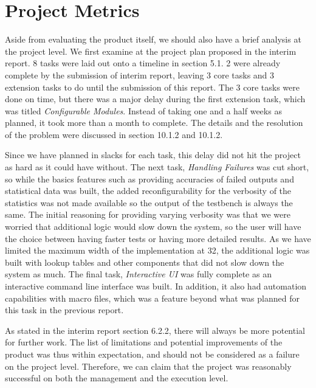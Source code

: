 \section{Project Metrics}
Aside from evaluating the product itself, we should also have a brief analysis at the project level.
We first examine at the project plan proposed in the interim report.
8 tasks were laid out onto a timeline in section 5.1.
2 were already complete by the submission of interim report, leaving 3 core tasks and 3 extension tasks to do until the submission of this report.
The 3 core tasks were done on time, but there was a major delay during the first extension task, which was titled \textit{Configurable Modules}.
Instead of taking one and a half weeks as planned, it took more than a month to complete.
The details and the resolution of the problem were discussed in section 10.1.2 and 10.1.2.

Since we have planned in slacks for each task, this delay did not hit the project as hard as it could have without.
The next task, \textit{Handling Failures} was cut short, so while the basics features such as providing accuracies of failed outputs and statistical data was built, the added reconfigurability for the verbosity of the statistics was not made available so the output of the testbench is always the same.
The initial reasoning for providing varying verbosity was that we were worried that additional logic would slow down the system, so the user will have the choice between having faster tests or having more detailed results.
As we have limited the maximum width of the implementation at 32, the additional logic was built with lookup tables and other components that did not slow down the system as much.
The final task, \textit{Interactive UI} was fully complete as an interactive command line interface was built.
In addition, it also had automation capabilities with macro files, which was a feature beyond what was planned for this task in the previous report.

As stated in the interim report section 6.2.2, there will always be more potential for further work.
The list of limitations and potential improvements of the product was thus within expectation, and should not be considered as a failure on the project level.
Therefore, we can claim that the project was reasonably successful on both the management and the execution level.
